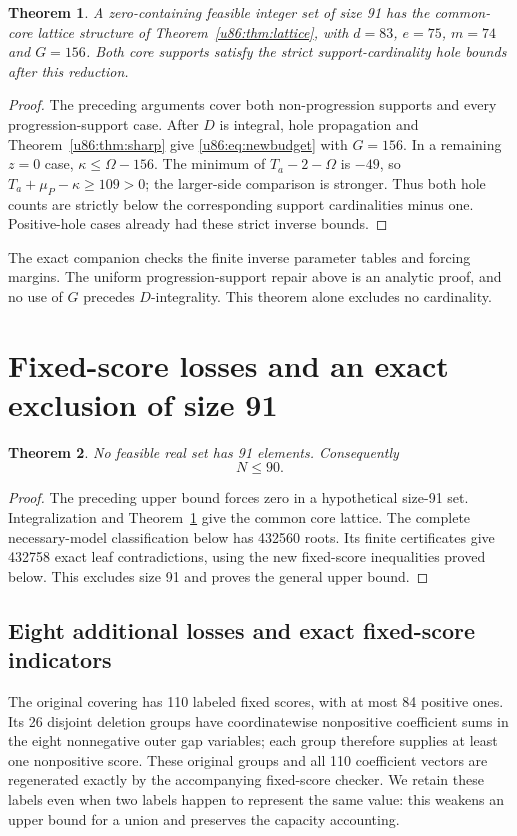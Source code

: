 \documentclass[11pt,a4paper]{article}
\newtheorem{theorem}{Theorem}[section]
\theoremstyle{remark}
\begin{document}
\begin{theorem}\label{u86:thm:lattice91}
A zero-containing feasible integer set of size 91 has the common-core
lattice structure of Theorem~\ref{u86:thm:lattice}, with $d=83$, $e=75$,
$m=74$ and $G=156$. Both core supports satisfy the strict
support-cardinality hole bounds after this reduction.
\end{theorem}
\begin{proof}
The preceding arguments cover both non-progression supports and every
progression-support case. After $D$ is integral, hole propagation and
Theorem~\ref{u86:thm:sharp} give \eqref{u86:eq:newbudget} with $G=156$.
In a remaining $z=0$ case, $\kappa\le\Omega-156$. The minimum of
$T_a-2-\Omega$ is $-49$, so $T_a+\mu_P-\kappa\ge109>0$;
the larger-side comparison is stronger. Thus both hole counts are
strictly below the corresponding support cardinalities minus one.
Positive-hole cases already had these strict inverse bounds.
\end{proof}
The exact companion  checks the finite inverse
parameter tables and forcing margins. The uniform progression-support
repair above is an analytic proof, and no use of $G$ precedes
$D$-integrality. This theorem alone excludes no cardinality.

\section{Fixed-score losses and an exact exclusion of size 91}\label{u86:sec:upper90}
\begin{theorem}\label{u86:thm:upper90}
No feasible real set has 91 elements. Consequently
\[
 \boxed{N\le90.}
\]
\end{theorem}
\begin{proof}
The preceding upper bound forces zero in a hypothetical size-91 set.
Integralization and Theorem~\ref{u86:thm:lattice91} give the common core
lattice. The complete necessary-model classification below has 432560
roots. Its finite certificates give 432758 exact leaf
contradictions, using the new fixed-score inequalities proved below.
This excludes size 91 and proves the general upper bound.
\end{proof}

\subsection{Eight additional losses and exact fixed-score indicators}
The original covering has 110 labeled fixed scores, with at most
84 positive ones. Its 26 disjoint deletion groups have coordinatewise
nonpositive coefficient sums in the eight nonnegative outer gap variables;
each group therefore supplies at least one nonpositive score. These
original groups and all 110 coefficient vectors are regenerated exactly
by the accompanying fixed-score checker. We retain these labels even
when two labels happen to represent the same value: this weakens an upper
bound for a union and preserves the capacity accounting.
\end{document}
